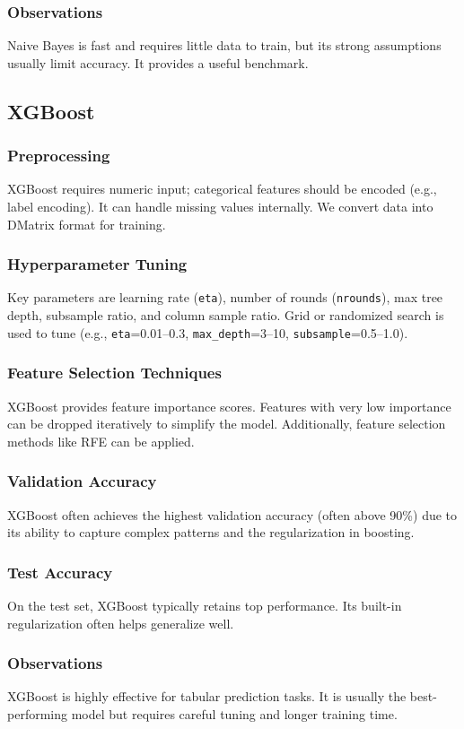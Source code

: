 \documentclass[12pt]{article}
\begin{document}
\subsubsection{Observations}
Naive Bayes is fast and requires little data to train, but its strong assumptions usually limit accuracy. It provides a useful benchmark.

\subsection{XGBoost}
\subsubsection{Preprocessing}
XGBoost requires numeric input; categorical features should be encoded (e.g., label encoding). It can handle missing values internally. We convert data into DMatrix format for training.
\subsubsection{Hyperparameter Tuning}
Key parameters are learning rate (\texttt{eta}), number of rounds (\texttt{nrounds}), max tree depth, subsample ratio, and column sample ratio. Grid or randomized search is used to tune (e.g., \texttt{eta}=0.01--0.3, \texttt{max\_depth}=3--10, \texttt{subsample}=0.5--1.0).
\subsubsection{Feature Selection Techniques}
XGBoost provides feature importance scores. Features with very low importance can be dropped iteratively to simplify the model. Additionally, feature selection methods like RFE can be applied.
\subsubsection{Validation Accuracy}
XGBoost often achieves the highest validation accuracy (often above 90\%) due to its ability to capture complex patterns and the regularization in boosting.
\subsubsection{Test Accuracy}
On the test set, XGBoost typically retains top performance. Its built-in regularization often helps generalize well.
\subsubsection{Observations}
XGBoost is highly effective for tabular prediction tasks. It is usually the best-performing model but requires careful tuning and longer training time.
\end{document}
